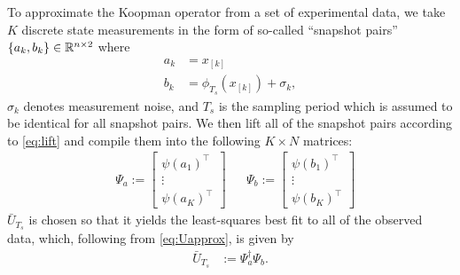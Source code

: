 To approximate the Koopman operator from a set of experimental data, we take $K$ discrete state measurements 
in the form of so-called ``snapshot pairs'' ${ \{ a_k , b_k \} \in \mathbb{R}^{n \times 2} }$ where
\begin{align}
    a_{k} &= x_{[k]} \\
    b_{k} &= \phi_{T_s} (x_{[k]}) + \sigma_k,
    \label{eq:ab}
\end{align}
$\sigma_k$ denotes measurement noise, and $T_s$ is the sampling period which is assumed to be identical for all snapshot pairs.
We then lift all of the snapshot pairs according to \eqref{eq:lift} and compile them into the following ${K \times N}$ matrices:
\begin{align}
    &\Psi_a := \begin{bmatrix} {\psi}(a_1)^\top \\ \vdots \\  {\psi}(a_K)^\top \end{bmatrix}
    &&\Psi_b := \begin{bmatrix} {\psi}(b_1)^\top \\ \vdots \\  {\psi}(b_K)^\top \end{bmatrix}
    \label{eq:Psi}
\end{align}
$\bar{U}_{T_s}$ is chosen so that it yields the least-squares best fit to all of the observed data, which, following from \eqref{eq:Uapprox}, is given by 
\begin{align}
    \bar{U}_{T_s} &:= \Psi_a^\dagger \Psi_b.
\end{align}


